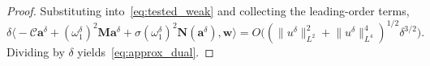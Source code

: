 \documentclass[10pt,a4paper]{amsart}
\begin{document}
\begin{proof}
    Substituting into~\eqref{eq:tested_weak} and collecting the
    leading-order terms,
    \begin{equation}
        \delta \bigl\langle
          -\mathcal{C} \mathbf{a}^\delta
          + (\omega_1^\delta)^2 \mathbf{M} \mathbf{a}^\delta
          + \sigma (\omega_1^\delta)^2
            \mathbf{N}(\mathbf{a}^\delta),
          \mathbf{w}
        \bigr\rangle
        = O\bigl(
          (\lVert u^\delta \rVert_{L^2}^2
            + \lVert u^\delta \rVert_{L^4}^4)^{1/2}
          \delta^{3/2}
        \bigr).
    \end{equation}
    Dividing by $\delta$ yields~\eqref{eq:approx_dual}.
\end{proof}
\end{document}
